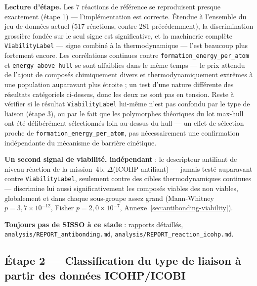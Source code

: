 \documentclass[11pt,a4paper]{article}
\begin{document}
\textbf{Lecture d'étape.} Les 7 réactions de référence se reproduisent
presque exactement (étape 1) --- l'implémentation est correcte. Étendue
à l'ensemble du jeu de données actuel (517 réactions, contre 281
précédemment), la discrimination grossière fondée sur le seul signe est
significative, et la machinerie complète
\texttt{ViabilityLabel} --- signe combiné à la thermodynamique --- l'est
beaucoup plus fortement encore. Les corrélations continues contre
\texttt{formation\_energy\_per\_atom} et \texttt{energy\_above\_hull}
se sont affaiblies dans le même temps --- le prix attendu de l'ajout de
composés chimiquement divers et thermodynamiquement extrêmes à une
population auparavant plus étroite ; un test d'une nature différente
des résultats catégoriels ci-dessus, donc les deux ne sont pas en
tension. Reste à vérifier si le résultat \texttt{ViabilityLabel}
lui-même n'est pas confondu par le type de liaison (étape 3), ou par le
fait que les polymorphes théoriques du lot max-hull ont été
délibérément sélectionnés loin au-dessus du hull --- un effet de
sélection proche de \texttt{formation\_energy\_per\_atom}, pas
nécessairement une confirmation indépendante du mécanisme de barrière
cinétique.

\textbf{Un second signal de viabilité, indépendant} : le descripteur
antiliant de niveau réaction de la mission~4b, $\Delta$(ICOHP antiliant)
--- jamais testé auparavant contre \texttt{ViabilityLabel}, seulement
contre des cibles thermodynamiques continues --- discrimine lui aussi
significativement les composés viables des non viables, globalement et
dans chaque sous-groupe assez grand (Mann-Whitney $p=3,7\times10^{-12}$,
Fisher $p=2,0\times10^{-7}$, Annexe~\ref{sec:antibonding-viability}).

\textbf{Toujours pas de SISSO à ce stade} : rapports détaillés,
\texttt{analysis/REPORT\_antibonding.md},
\texttt{analysis/REPORT\_reaction\_icohp.md}.

\subsection{Étape 2 --- Classification du type de liaison à partir des données ICOHP/ICOBI}
\label{sec:bondtype-classification}
\end{document}
